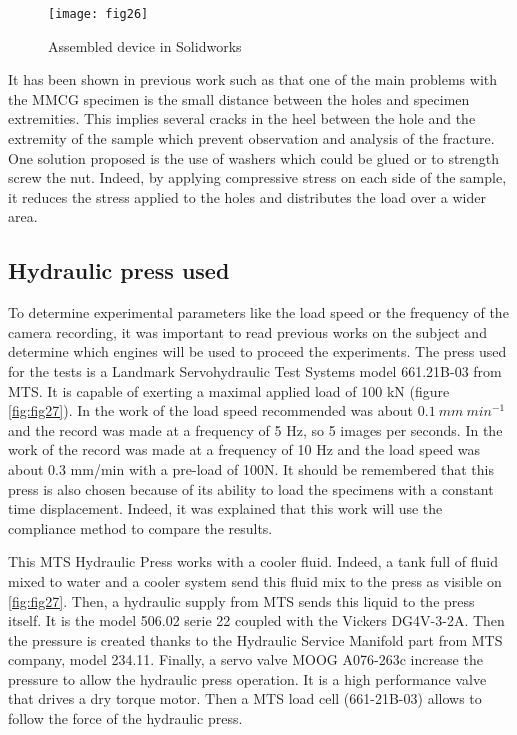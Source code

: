 \begin{figure}[htp]
	\centering
	\texttt{[image: fig26]}
	\caption{Assembled device in Solidworks}
	\label{fig:fig26}
\end{figure}

It has been shown in previous work such as \cite{Odounga2018phd} that one of the main problems with the MMCG specimen is the small distance between the holes and specimen extremities. This implies several cracks in the heel between the hole and the extremity of the sample which prevent observation and analysis of the fracture. One solution proposed is the use of washers which could be glued or to strength screw the nut. Indeed, by applying compressive stress on each side of the sample, it reduces the stress applied to the holes and distributes the load over a wider area.

\subsection{Hydraulic press used}

To determine experimental parameters like the load speed or the frequency of the camera recording, it was important to read previous works on the subject and determine which engines will be used to proceed the experiments. The press used for the tests is a Landmark Servohydraulic Test Systems model 661.21B-03  from MTS. It is capable of exerting a maximal applied load of 100 kN (figure \ref{fig:fig27}).
In the work of \cite{Ostapska2021} the load speed recommended was about $0.1\ mm\ {min}^{-1}$ and the record was made at a frequency of 5 Hz, so 5 images per seconds. In the work of \cite{Mambili2018} the record was made at a frequency of 10 Hz and the load speed was about 0.3 mm/min with a pre-load of 100N. It should be remembered that this press is also chosen because of its ability to load the specimens with a constant time displacement. Indeed, it was explained that this work will use the compliance method to compare the results.

This MTS Hydraulic Press works with a cooler fluid. Indeed, a tank full of fluid mixed to water and a cooler system send this fluid mix to the press as visible on \ref{fig:fig27}. Then, a hydraulic supply from MTS sends this liquid to the press itself. It is the model 506.02 serie 22 coupled with the Vickers DG4V-3-2A. Then the pressure is created thanks to the Hydraulic Service Manifold part from MTS company, model 234.11. Finally, a servo valve MOOG A076-263c increase the pressure to allow the hydraulic press operation. It is a high performance valve that drives a dry torque motor. Then a MTS load cell (661-21B-03) allows to follow the force of the hydraulic press.


